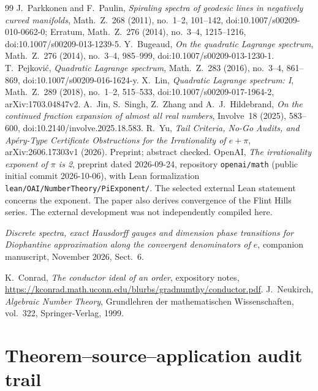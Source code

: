 \documentclass[11pt]{amsart}
\theoremstyle{definition}
\theoremstyle{remark}
\numberwithin{equation}{section}
\begin{document}
\begin{thebibliography}{99}
 J.~Parkkonen and F.~Paulin, \emph{Spiraling spectra of geodesic lines in negatively curved manifolds}, Math.~Z.~268 (2011), no.~1--2, 101--142, doi:10.1007/s00209-010-0662-0; Erratum, Math.~Z.~276 (2014), no.~3--4, 1215--1216, doi:10.1007/s00209-013-1239-5.
 Y.~Bugeaud, \emph{On the quadratic Lagrange spectrum}, Math.~Z.~276 (2014), no.~3--4, 985--999, doi:10.1007/s00209-013-1230-1.
 T.~Pejkovi\'c, \emph{Quadratic Lagrange spectrum}, Math.~Z.~283 (2016), no.~3--4, 861--869, doi:10.1007/s00209-016-1624-y.
 X.~Lin, \emph{Quadratic Lagrange spectrum: I}, Math.~Z.~289 (2018), no.~1--2, 515--533, doi:10.1007/s00209-017-1964-2, arXiv:1703.04847v2.
 A.~Jin, S.~Singh, Z.~Zhang and A.~J.~Hildebrand, \emph{On the continued fraction expansion of almost all real numbers}, Involve~18 (2025), 583--600, doi:10.2140/involve.2025.18.583.
 R.~Yu, \emph{Tail Criteria, No-Go Audits, and Ap\'ery-Type Certificate Obstructions for the Irrationality of $e+\pi$}, arXiv:2606.17303v1 (2026). Preprint; abstract checked.
 OpenAI, \emph{The irrationality exponent of $\pi$ is 2}, preprint dated 2026-09-24, repository \texttt{openai/math} (public initial commit 2026-10-06), with Lean formalization \texttt{lean/OAI/NumberTheory/PiExponent/}. The selected external Lean statement concerns the exponent. The paper also derives convergence of the Flint Hills series. The external development was not independently compiled here.

 \emph{Discrete spectra, exact Hausdorff gauges and dimension phase transitions for Diophantine approximation along the convergent denominators of $e$}, companion manuscript, November 2026, Sect.~6.

K.~Conrad, \emph{The conductor ideal of an order}, expository notes,
\url{https://kconrad.math.uconn.edu/blurbs/gradnumthy/conductor.pdf}.
J.~Neukirch, \emph{Algebraic Number Theory}, Grundlehren der
mathematischen Wissenschaften, vol.~322, Springer-Verlag, 1999.
\end{thebibliography}

\clearpage
\appendix

\section{Theorem--source--application audit trail}\label{app:audit}
\end{document}
